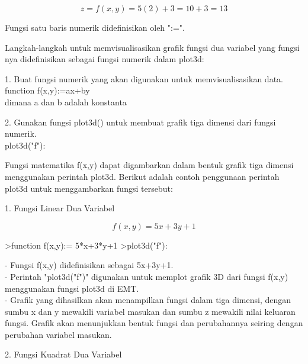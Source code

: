 \documentclass[a4paper,10pt]{article}
\begin{document}
\begin{eulernotebook}
\begin{eulercomment}
\begin{eulercomment}
\begin{eulercomment}
\begin{eulercomment}
\begin{eulercomment}
\begin{eulercomment}
\begin{eulercomment}
\begin{eulercomment}
\begin{eulercomment}
\end{eulercomment}
\begin{eulerformula}
\[
z = f(x,y) = 5(2)+3 = 10+3 = 13
\]
\end{eulerformula}
\begin{eulercomment}
\end{eulercomment}
\begin{eulercomment}
Fungsi satu baris numerik didefinisikan oleh ":=".

Langkah-langkah untuk memvisualisasikan grafik fungsi dua variabel
yang fungsi nya didefinisikan sebagai fungsi numerik dalam plot3d:

1. Buat fungsi numerik yang akan digunakan untuk memvisualisasikan
data.\\
function f(x,y):=ax+by\\
dimana a dan b adalah konstanta

2. Gunakan fungsi plot3d() untuk membuat grafik tiga dimensi dari
fungsi numerik.\\
plot3d("f"):

\end{eulercomment}
\begin{eulercomment}
Fungsi matematika f(x,y) dapat digambarkan dalam bentuk grafik tiga
dimensi menggunakan perintah plot3d. Berikut adalah contoh penggunaan
perintah plot3d untuk menggambarkan fungsi tersebut:

1. Fungsi Linear Dua Variabel

\end{eulercomment}
\begin{eulerformula}
\[
f(x,y)=5x+3y+1
\]
\end{eulerformula}
\begin{eulerprompt}
>function f(x,y):= 5*x+3*y+1
>plot3d("f"):
\end{eulerprompt}
\begin{eulercomment}
- Fungsi f(x,y) didefinisikan sebagai 5x+3y+1.\\
- Perintah "plot3d("f")" digunakan untuk memplot grafik 3D dari fungsi
f(x,y) menggunakan fungsi plot3d di EMT.\\
- Grafik yang dihasilkan akan menampilkan fungsi dalam tiga dimensi,
dengan sumbu x dan y mewakili variabel masukan dan sumbu z mewakili
nilai keluaran fungsi. Grafik akan menunjukkan bentuk fungsi dan
perubahannya seiring dengan perubahan variabel masukan.

\end{eulercomment}
\eulersubheading{}
\begin{eulercomment}
2. Fungsi Kuadrat Dua Variabel


\end{eulercomment}
\end{eulercomment}
\end{eulercomment}
\end{eulercomment}
\end{eulercomment}
\end{eulercomment}
\end{eulercomment}
\end{eulercomment}
\end{eulercomment}
\end{eulernotebook}
\end{document}
